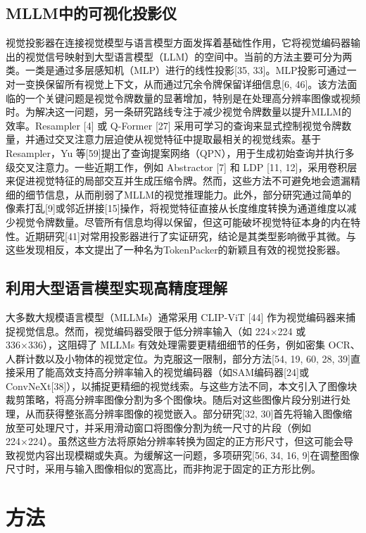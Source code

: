 \subsection{MLLM中的可视化投影仪}

视觉投影器在连接视觉模型与语言模型方面发挥着基础性作用，它将视觉编码器输出的视觉信号映射到大型语言模型（LLM）的空间中。当前的方法主要可分为两类。一类是通过多层感知机（MLP）进行的线性投影[35, 33]。MLP投影可通过一对一变换保留所有视觉上下文，从而通过冗余令牌保留详细信息[6, 46]。该方法面临的一个关键问题是视觉令牌数量的显著增加，特别是在处理高分辨率图像或视频时。为解决这一问题，另一条研究路线专注于减少视觉令牌数量以提升MLLM的效率。Resampler [4] 或 Q-Former [27] 采用可学习的查询来显式控制视觉令牌数量，并通过交叉注意力层迫使从视觉特征中提取最相关的视觉线索。基于 Resampler，Yu 等[59]提出了查询提案网络（QPN），用于生成初始查询并执行多级交叉注意力。一些近期工作，例如 Abstractor [7] 和 LDP [11, 12]，采用卷积层来促进视觉特征的局部交互并生成压缩令牌。然而，这些方法不可避免地会遗漏精细的细节信息，从而削弱了MLLM的视觉推理能力。此外，部分研究通过简单的像素打乱[9]或邻近拼接[15]操作，将视觉特征直接从长度维度转换为通道维度以减少视觉令牌数量。尽管所有信息均得以保留，但这可能破坏视觉特征本身的内在特性。近期研究[41]对常用投影器进行了实证研究，结论是其类型影响微乎其微。与这些发现相反，本文提出了一种名为TokenPacker的新颖且有效的视觉投影器。

\subsection{利用大型语言模型实现高精度理解}

大多数大规模语言模型（MLLMs）通常采用 CLIP-ViT [44] 作为视觉编码器来捕捉视觉信息。然而，视觉编码器受限于低分辨率输入（如 224×224 或 336×336），这阻碍了 MLLMs 有效处理需要更精细细节的任务，例如密集 OCR、人群计数以及小物体的视觉定位。为克服这一限制，部分方法[54, 19, 60, 28, 39]直接采用了能高效支持高分辨率输入的视觉编码器（如SAM编码器[24]或ConvNeXt[38]），以捕捉更精细的视觉线索。与这些方法不同，本文引入了图像块裁剪策略，将高分辨率图像分割为多个图像块。随后对这些图像片段分别进行处理，从而获得整张高分辨率图像的视觉嵌入。部分研究[32, 30]首先将输入图像缩放至可处理尺寸，并采用滑动窗口将图像分割为统一尺寸的片段（例如224×224）。虽然这些方法将原始分辨率转换为固定的正方形尺寸，但这可能会导致视觉内容出现模糊或失真。为缓解这一问题，多项研究[56, 34, 16, 9]在调整图像尺寸时，采用与输入图像相似的宽高比，而非拘泥于固定的正方形比例。

\section{方法}


